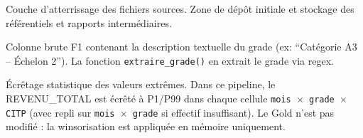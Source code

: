 \documentclass[12pt,a4paper,french]{report}
\begin{document}
\begin{description}[leftmargin=3cm, labelwidth=2.8cm, style=nextline]
  \item[Staging] Couche d'atterrissage des fichiers sources. Zone de dépôt
  initiale et stockage des référentiels et rapports intermédiaires.

  \item[statut\_fonctionnaire] Colonne brute F1 contenant la description
  textuelle du grade (ex: ``Catégorie A3 -- Échelon 2''). La fonction
  \texttt{extraire\_grade()} en extrait le grade via regex.

  \item[Winsorisation] Écrêtage statistique des valeurs extrêmes. Dans ce
  pipeline, le REVENU\_TOTAL est écrêté à P1/P99 dans chaque cellule
  \texttt{mois $\times$ grade $\times$ CITP} (avec repli sur
  \texttt{mois $\times$ grade} si effectif insuffisant). Le Gold n'est pas
  modifié : la winsorisation est appliquée en mémoire uniquement.

\end{description}
\end{document}
